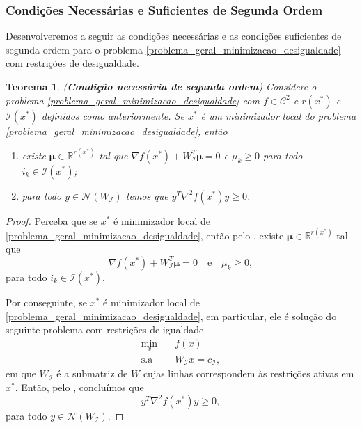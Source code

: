 \documentclass[12pt,a4paper]{scrartcl}
\def\RR{\mathds{R}}
\newtheorem{teo}{Teorema}
\theoremstyle{definition}%
\begin{document}
\subsubsection{Condições Necessárias e Suficientes de Segunda Ordem}

Desenvolveremos a seguir as condições necessárias e as condições suficientes de segunda ordem para o problema \eqref{problema_geral_minimizacao_desigualdade} com restrições de desigualdade.

\begin{teo}(\textbf{Condição necessária de segunda ordem}) \label{teo:condicao_necessaria_2ordem_desigualdade}
Considere o problema \eqref{problema_geral_minimizacao_desigualdade} com $f \in \mathcal{C}^{2}$ e $r(x^{*})$ e $\mathcal{I}(x^{*})$ definidos como anteriormente. Se $x^{*}$ é um minimizador local do problema \eqref{problema_geral_minimizacao_desigualdade},  então
\begin{enumerate}
	\item[(i)] existe $\boldsymbol{\mu} \in \RR^{r(x^{*})}$ tal que $\nabla f(x^{*}) + W_{\mathcal{I}}^{T} \boldsymbol{\mu} =0$ e $\mu_{k} \geq 0$ para todo $i_{k} \in \mathcal{I}(x^{*})$;

	\item[(ii)] para todo $y \in \mathcal{N}(W_{\mathcal{I}})$ temos que $y^{T} \nabla^{2} f(x^{*})y \geq 0$.
\end{enumerate}
\end{teo}
\begin{proof}
Perceba que se $x^{*}$ é minimizador local de \eqref{problema_geral_minimizacao_desigualdade}, então pelo , existe $\boldsymbol{\mu} \in \RR^{r(x^{*})}$ tal que 
\[
\nabla f(x^{*}) + W_{\mathcal{I}}^{T} \boldsymbol{\mu} =0 \quad \text{e} \quad \mu_{k} \geq 0,
\] 
para todo $i_k \in \mathcal{I}(x^{*})$.

Por conseguinte, se $x^{*}$ é minimizador local de \eqref{problema_geral_minimizacao_desigualdade}, em particular, ele é solução do seguinte problema com restrições de igualdade
\[ 
\begin{aligned}
\min_{x} & \quad f(x) \\
\text{s.a} & \quad W_{\mathcal{I}}x=c_{\mathcal{I}} ,
\end{aligned}
\]
em que $W_{\mathcal{I}}$ é a submatriz de $W$ cujas linhas correspondem às restrições ativas em $x^{*}$. Então, pelo , concluímos que
\[
y^{T}\nabla^{2} f(x^{*})y \geq 0, 
\]
para todo $y \in \mathcal{N}(W_{\mathcal{I}})$. 
\end{proof}
\end{document}

